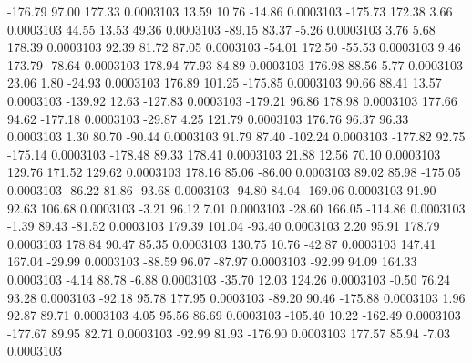      -176.79       97.00      177.33     0.0003103
       13.59       10.76      -14.86     0.0003103
     -175.73      172.38        3.66     0.0003103
       44.55       13.53       49.36     0.0003103
      -89.15       83.37       -5.26     0.0003103
        3.76        5.68      178.39     0.0003103
       92.39       81.72       87.05     0.0003103
      -54.01      172.50      -55.53     0.0003103
        9.46      173.79      -78.64     0.0003103
      178.94       77.93       84.89     0.0003103
      176.98       88.56        5.77     0.0003103
       23.06        1.80      -24.93     0.0003103
      176.89      101.25     -175.85     0.0003103
       90.66       88.41       13.57     0.0003103
     -139.92       12.63     -127.83     0.0003103
     -179.21       96.86      178.98     0.0003103
      177.66       94.62     -177.18     0.0003103
      -29.87        4.25      121.79     0.0003103
      176.76       96.37       96.33     0.0003103
        1.30       80.70      -90.44     0.0003103
       91.79       87.40     -102.24     0.0003103
     -177.82       92.75     -175.14     0.0003103
     -178.48       89.33      178.41     0.0003103
       21.88       12.56       70.10     0.0003103
      129.76      171.52      129.62     0.0003103
      178.16       85.06      -86.00     0.0003103
       89.02       85.98     -175.05     0.0003103
      -86.22       81.86      -93.68     0.0003103
      -94.80       84.04     -169.06     0.0003103
       91.90       92.63      106.68     0.0003103
       -3.21       96.12        7.01     0.0003103
      -28.60      166.05     -114.86     0.0003103
       -1.39       89.43      -81.52     0.0003103
      179.39      101.04      -93.40     0.0003103
        2.20       95.91      178.79     0.0003103
      178.84       90.47       85.35     0.0003103
      130.75       10.76      -42.87     0.0003103
      147.41      167.04      -29.99     0.0003103
      -88.59       96.07      -87.97     0.0003103
      -92.99       94.09      164.33     0.0003103
       -4.14       88.78       -6.88     0.0003103
      -35.70       12.03      124.26     0.0003103
       -0.50       76.24       93.28     0.0003103
      -92.18       95.78      177.95     0.0003103
      -89.20       90.46     -175.88     0.0003103
        1.96       92.87       89.71     0.0003103
        4.05       95.56       86.69     0.0003103
     -105.40       10.22     -162.49     0.0003103
     -177.67       89.95       82.71     0.0003103
      -92.99       81.93     -176.90     0.0003103
      177.57       85.94       -7.03     0.0003103
